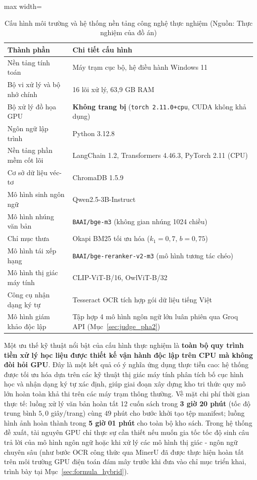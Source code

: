 \begin{table}[H]
\centering
\caption{Cấu hình môi trường và hệ thống nền tảng công nghệ thực nghiệm (Nguồn: Thực nghiệm của đồ án)}
\label{tab:env}
\small
\begin{adjustbox}{max width=\textwidth}
\begin{tabular}{p{4.8cm}p{10.2cm}}
\toprule
\textbf{Thành phần} & \textbf{Chi tiết cấu hình} \\
\midrule
Nền tảng tính toán & Máy trạm cục bộ, hệ điều hành Windows 11 \\
Bộ vi xử lý và bộ nhớ chính & 16 lõi xử lý, 63,9 GB RAM \\
Bộ xử lý đồ họa GPU & \textbf{Không trang bị} (\texttt{torch 2.11.0+cpu}, CUDA không khả dụng) \\
Ngôn ngữ lập trình & Python 3.12.8 \\
Nền tảng phần mềm cốt lõi & LangChain 1.2, Transformers 4.46.3, PyTorch 2.11 (CPU) \\
Cơ sở dữ liệu véc-tơ & ChromaDB 1.5.9 \\
Mô hình sinh ngôn ngữ & Qwen2.5-3B-Instruct \\
Mô hình nhúng văn bản & \texttt{BAAI/bge-m3} (không gian nhúng 1024 chiều) \\
Chỉ mục thưa & Okapi BM25 tối ưu hóa ($k_1 = 0{,}7$, $b = 0{,}75$) \\
Mô hình tái xếp hạng & \texttt{BAAI/bge-reranker-v2-m3} (mô hình tương tác chéo) \\
Mô hình thị giác máy tính & CLIP-ViT-B/16, OwlViT-B/32 \\
Công cụ nhận dạng ký tự & Tesseract OCR tích hợp gói dữ liệu tiếng Việt \\
Mô hình giám khảo độc lập & Tập hợp 4 mô hình ngôn ngữ lớn luân phiên qua Groq API (Mục~\ref{sec:judge_pha2}) \\
\bottomrule
\end{tabular}
\end{adjustbox}
\end{table}

Một ưu thế kỹ thuật nổi bật của cấu hình thực nghiệm là \textbf{toàn bộ quy trình tiền xử lý học liệu được thiết kế vận hành độc lập trên CPU mà không đòi hỏi GPU}. Đây là một kết quả có ý nghĩa ứng dụng thực tiễn cao: hệ thống được tối ưu hóa dựa trên các kỹ thuật thị giác máy tính phân tích bố cục hình học và nhận dạng ký tự xác định, giúp giai đoạn xây dựng kho tri thức quy mô lớn hoàn toàn khả thi trên các máy trạm thông thường. Về mặt chi phí thời gian thực tế: luồng xử lý văn bản hoàn tất 12 cuốn sách trong \textbf{3 giờ 20 phút} (tốc độ trung bình $5{,}0$ giây/trang) cùng $49$ phút cho bước khởi tạo tệp manifest; luồng hình ảnh hoàn thành trong \textbf{5 giờ 01 phút} cho toàn bộ kho sách. Trong hệ thống đề xuất, tài nguyên GPU chỉ thực sự cần thiết nếu muốn gia tốc tốc độ sinh câu trả lời của mô hình ngôn ngữ hoặc khi xử lý các mô hình thị giác - ngôn ngữ chuyên sâu (như bước OCR công thức qua MinerU đã được thực hiện hoàn tất trên môi trường GPU điện toán đám mây trước khi đưa vào chỉ mục triển khai, trình bày tại Mục~\ref{sec:formula_hybrid}).

